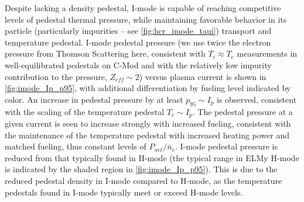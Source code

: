 Despite lacking a density pedestal, I-mode is capable of reaching competitive levels of pedestal thermal pressure, while maintaining favorable behavior  in its particle (particularly impurities -- see \cref{fig:hcr_imode_taui}) transport and temperature pedestal.  I-mode pedestal pressure (we use twice the electron pressure from Thomson Scattering here, consistent with $T_i \approx T_e$ measurements in well-equilibrated pedestals on C-Mod \cite{Hubbard2011} and with the relatively low impurity contribution to the pressure, $Z_{eff} \sim 2$) versus plasma current is shown in \cref{fig:imode_Ip_p95}, with additional differentiation by fueling level indicated by color.  An increase in pedestal pressure by at least $p_{95} \sim I_p$ is observed, consistent with the scaling of the temperature pedestal $T_e \sim I_p$.  The pedestal pressure at a given current is seen to increase strongly with increased fueling, consistent with the maintenance of the temperature pedestal with increased heating power and matched fueling, thus constant levels of $P_{net}/\overline{n}_e$.  I-mode pedestal pressure is reduced from that typically found in H-mode (the typical range in ELMy H-mode is indicated by the shaded region in \cref{fig:imode_Ip_p95}).  This is due to the reduced pedestal density in I-mode compared to H-mode, as the temperature pedestals found in I-mode typically meet or exceed H-mode levels.

\begin{figure}[h]
 \pushtooutside
\end{figure}


